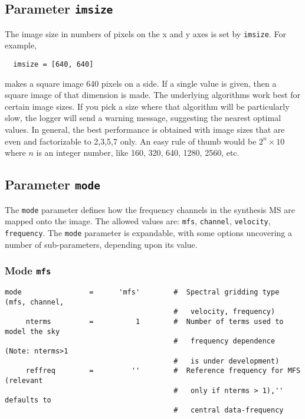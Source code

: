 \subsection{Parameter {\tt imsize} }
\label{section:im.pars.imsize}

The image size in numbers of pixels on the x and y axes is
set by {\tt imsize}.  For example,
\small
\begin{verbatim}
  imsize = [640, 640]
\end{verbatim}
\normalsize makes a square image 640 pixels on a side.  If a single
value is given, then a square image of that dimension is made.  The
underlying algorithms work best for certain image sizes. If you pick a
size where that algorithm will be particularly slow, the logger will
send a warning message, suggesting the nearest optimal values. In
general, the best performance is obtained with image sizes that are
even and factorizable to 2,3,5,7 only. An easy rule of thumb would be
$2^{n}\times10$ where $n$ is an integer number, like 160, 320, 640,
1280, 2560, etc.


%
%
\subsection{Parameter {\tt mode} }
\label{section:im.pars.mode}

The {\tt mode} parameter defines how the frequency channels in the
synthesis MS are mapped onto the image.  The allowed values are:
{\tt mfs}, {\tt channel}, {\tt velocity}, {\tt frequency}.
The {\tt mode} parameter
is expandable, with some options uncovering a number of
sub-parameters, depending upon its value.

\subsubsection{Mode {\tt mfs} }
\label{section:im.pars.mode.mfs}
\small
\begin{verbatim}
mode                =      'mfs'        #  Spectral gridding type (mfs, channel,
                                        #   velocity, frequency)
     nterms         =          1        #  Number of terms used to model the sky
                                        #   frequency dependence (Note: nterms>1
                                        #   is under development)
     reffreq        =         ''        #  Reference frequency for MFS (relevant
                                        #   only if nterms > 1),'' defaults to
                                        #   central data-frequency
\end{verbatim}
\normalsize


